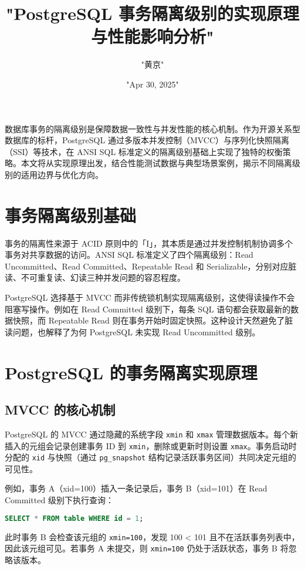 \title{"PostgreSQL 事务隔离级别的实现原理与性能影响分析"}
\author{"黄京"}
\date{"Apr 30, 2025"}
\maketitle
数据库事务的隔离级别是保障数据一致性与并发性能的核心机制。作为开源关系型数据库的标杆，PostgreSQL 通过多版本并发控制（MVCC）与序列化快照隔离（SSI）等技术，在 ANSI SQL 标准定义的隔离级别基础上实现了独特的权衡策略。本文将从实现原理出发，结合性能测试数据与典型场景案例，揭示不同隔离级别的适用边界与优化方向。\par
\chapter{事务隔离级别基础}
事务的隔离性来源于 ACID 原则中的「I」，其本质是通过并发控制机制协调多个事务对共享数据的访问。ANSI SQL 标准定义了四个隔离级别：Read Uncommitted、Read Committed、Repeatable Read 和 Serializable，分别对应脏读、不可重复读、幻读三种并发问题的容忍程度。\par
PostgreSQL 选择基于 MVCC 而非传统锁机制实现隔离级别，这使得读操作不会阻塞写操作。例如在 Read Committed 级别下，每条 SQL 语句都会获取最新的数据快照，而 Repeatable Read 则在事务开始时固定快照。这种设计天然避免了脏读问题，也解释了为何 PostgreSQL 未实现 Read Uncommitted 级别。\par
\chapter{PostgreSQL 的事务隔离实现原理}
\section{MVCC 的核心机制}
PostgreSQL 的 MVCC 通过隐藏的系统字段 \texttt{xmin} 和 \texttt{xmax} 管理数据版本。每个新插入的元组会记录创建事务 ID 到 \texttt{xmin}，删除或更新时则设置 \texttt{xmax}。事务启动时分配的 \texttt{xid} 与快照（通过 \texttt{pg\_{}snapshot} 结构记录活跃事务区间）共同决定元组的可见性。\par
例如，事务 A（xid=100）插入一条记录后，事务 B（xid=101）在 Read Committed 级别下执行查询：\par
\begin{lstlisting}[language=sql]
SELECT * FROM table WHERE id = 1;
\end{lstlisting}
此时事务 B 会检查该元组的 \texttt{xmin=100}，发现 100 < 101 且不在活跃事务列表中，因此该元组可见。若事务 A 未提交，则 \texttt{xmin=100} 仍处于活跃状态，事务 B 将忽略该版本。\par
